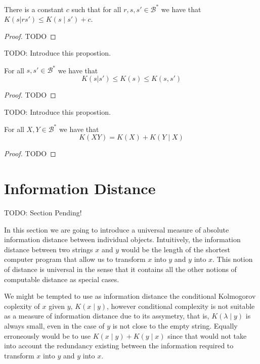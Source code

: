 \begin{proposition}
\label{prop:kolmogorov_joint_conditional}
There is a constant $c$ such that for all $r ,s, s'\in\mathcal{B}^{\ast}$ we have that $K(s | rs' ) \leq K(s \mid s') + c$.
\end{proposition}
\begin{proof}
{\color{red} TODO}
\end{proof}


{\color{red} TODO: Introduce this propostion.}

\begin{proposition}
\label{prop:kolmogorov_relations}
For all $s, s'\in\mathcal{B}^{\ast}$ we have that
\[
K(s | s' ) \leq K(s) \leq K(s, s')
\]
\end{proposition}
\begin{proof}
{\color{red} TODO}
\end{proof}

{\color{red} TODO: Introduce this propostion.}

\begin{proposition}
\label{prop:kolmogorov_relations}
For all $X, Y\in\mathcal{B}^{\ast}$ we have that
\[
K(XY) = K(X) + K(Y \mid X)
\]
\end{proposition}
\begin{proof}
{\color{red} TODO}
\end{proof}

%
%

\section{Information Distance}
\label{sec:information_distance}

{\color{red} TODO: Section Pending!}

In this section we are going to introduce a universal measure of absolute information distance between individual objects. Intuitively, the information distance between two strings $x$ and $y$ would be the length of the shortest computer program that allow us to transform $x$ into $y$ and $y$ into $x$. This notion of distance is universal in the sense that it contains all the other notions of computable distance as special cases.

We might be tempted to use as information distance the conditional Kolmogorov coplexity of $x$ given $y$, $K(x \mid y)$, however conditional complexity is not suitable as a measure of information distance due to its assymetry, that is, $K( \lambda \mid y)$ is always small, even in the case of $y$ is not close to the empty string. Equally erroneously would be to use $K(x \mid y) + K(y \mid x)$ since that would not take into account the redundancy existing between the information required to transform $x$ into $y$ and $y$ into $x$.

